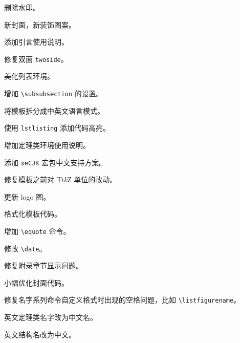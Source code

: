 \documentclass[lang=cn,10pt,cite=super]{elegantbook}
\begin{document}

\begin{change}
  \item 删除水印。
  \item 新封面，新装饰图案。
  \item 添加引言使用说明。
  \item 修复双面 \lstinline{twoside}。
  \item 美化列表环境。
  \item 增加 \lstinline{\subsubsection} 的设置。
  \item 将模板拆分成中英文语言模式。
  \item 使用 \lstinline{lstlisting} 添加代码高亮。
  \item 增加定理类环境使用说明。
\end{change}


\begin{change}
  \item 添加 \lstinline{xeCJK} 宏包中文支持方案。
  \item 修复模板之前对 Ti\textit{k}Z 单位的改动。
  \item 更新 logo 图。
\end{change}


\begin{change}
  \item 格式化模板代码。
  \item 增加 \lstinline{\equote} 命令。
  \item 修改 \lstinline{\date}。
\end{change}


\begin{change}
  \item 修复附录章节显示问题。
  \item 小幅优化封面代码。
\end{change}


\begin{change}
  \item 修复名字系列命令自定义格式时出现的空格问题，比如 \lstinline{\listfigurename}。
  \item 英文定理类名字改为中文名。
  \item 英文结构名改为中文。
\end{change}
\end{document}
